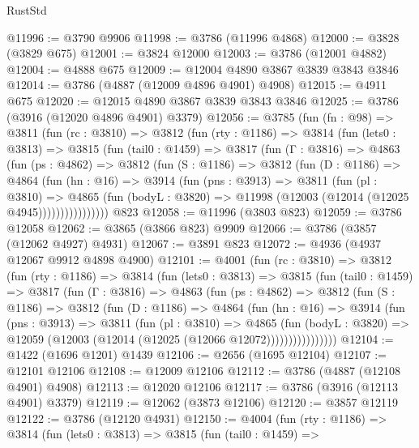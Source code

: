 \begin{lexlean}{RustStd}
\begin{coremodule}
@11996 := @3790 @9906
@11998 := @3786 (@11996 @4868)
@12000 := @3828 (@3829 @675)
@12001 := @3824 @12000
@12003 := @3786 (@12001 @4882)
@12004 := @4888 @675
@12009 := @12004 @4890 @3867 @3839 @3843 @3846
@12014 := @3786 (@4887 (@12009 @4896 @4901) @4908)
@12015 := @4911 @675
@12020 := @12015 @4890 @3867 @3839 @3843 @3846
@12025 := @3786 (@3916 (@12020 @4896 @4901) @3379)
@12056 := @3785
    (fun (fn : @98) =>
    @3811
      (fun (rc : @3810) =>
      @3812
        (fun (rty : @1186) =>
        @3814
          (fun (lets0 : @3813) =>
          @3815
            (fun (tail0 : @1459) =>
            @3817
              (fun (Γ : @3816) =>
              @4863
                (fun (ps : @4862) =>
                @3812
                  (fun (S : @1186) =>
                  @3812
                    (fun (D : @1186) =>
                    @4864
                      (fun (hn : @16) =>
                      @3914
                        (fun (pns : @3913) =>
                        @3811
                          (fun (pl : @3810) =>
                          @4865
                            (fun (bodyL : @3820) =>
                            @11998 (@12003 (@12014 (@12025 @4945))))))))))))))))
    @823
@12058 := @11996 (@3803 @823)
@12059 := @3786 @12058
@12062 := @3865 (@3866 @823) @9909
@12066 := @3786 (@3857 (@12062 @4927) @4931)
@12067 := @3891 @823
@12072 := @4936 (@4937 @12067 @9912 @4898 @4900)
@12101 := @4001
    (fun (rc : @3810) =>
    @3812
      (fun (rty : @1186) =>
      @3814
        (fun (lets0 : @3813) =>
        @3815
          (fun (tail0 : @1459) =>
          @3817
            (fun (Γ : @3816) =>
            @4863
              (fun (ps : @4862) =>
              @3812
                (fun (S : @1186) =>
                @3812
                  (fun (D : @1186) =>
                  @4864
                    (fun (hn : @16) =>
                    @3914
                      (fun (pns : @3913) =>
                      @3811
                        (fun (pl : @3810) =>
                        @4865
                          (fun (bodyL : @3820) =>
                          @12059 (@12003 (@12014 (@12025 (@12066 @12072))))))))))))))))
@12104 := @1422 (@1696 @1201) @1439
@12106 := @2656 (@1695 @12104)
@12107 := @12101 @12106
@12108 := @12009 @12106
@12112 := @3786 (@4887 (@12108 @4901) @4908)
@12113 := @12020 @12106
@12117 := @3786 (@3916 (@12113 @4901) @3379)
@12119 := @12062 (@3873 @12106)
@12120 := @3857 @12119
@12122 := @3786 (@12120 @4931)
@12150 := @4004
    (fun (rty : @1186) =>
    @3814
      (fun (lets0 : @3813) =>
      @3815
        (fun (tail0 : @1459) =>

\end{coremodule}
\end{lexlean}
